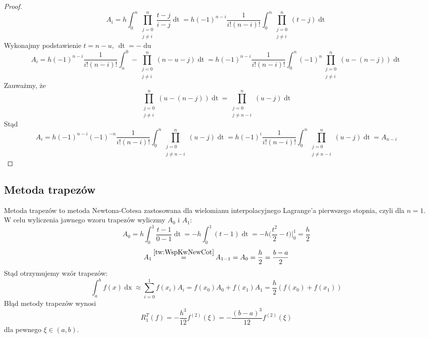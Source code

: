 \documentclass[11pt,wide]{article}
\newcommand\numeq[1]%
  {\stackrel{\scriptscriptstyle \mkern-1.5mu#1\mkern-1.5mu }{=}}
\begin{document}
\begin{proof}
\begin{equation}
A_i = h \int_0^n \prod_{\substack{j=0 \\ j \neq i}}^n \frac{t-j}{i-j} \mathop{dt} = h (-1)^{n-i} \frac{1}{i!(n-i)!} \int_0^n \prod_{\substack{j=0 \\ j \neq i}}^n (t-j) \mathop{dt}
\end{equation}
Wykonajmy podstawienie \(t = n - u, \ \mathop{dt} = - \mathop{du}\)
\begin{equation}
A_i = h (-1)^{n-i} \frac{1}{i!(n-i)!} \int_n^0 -\prod_{\substack{j=0 \\ j \neq i}}^n (n-u-j) \mathop{dt} = h (-1)^{n-i} \frac{1}{i!(n-i)!} \int_0^n (-1)^n \prod_{\substack{j=0 \\ j \neq i}}^n (u-(n-j)) \mathop{dt}
\end{equation}
Zauważmy, że
\begin{equation}
\prod_{\substack{j=0 \\ j \neq i}}^n (u-(n-j)) \mathop{dt} = \prod_{\substack{j=0 \\ j \neq n-i}}^n (u-j) \mathop{dt}
\end{equation}
Stąd
\begin{equation}
A_i = h (-1)^{n-i} (-1)^{-n}  \frac{1}{i!(n-i)!} \int_0^n \prod_{\substack{j=0 \\ j \neq n-i}}^n (u-j) \mathop{dt} = h (-1)^{i}  \frac{1}{i!(n-i)!} \int_0^n \prod_{\substack{j=0 \\ j \neq n-i}}^n (u-j) \mathop{dt} = A_{n-i}
\end{equation}
\end{proof}


\subsection{Metoda trapezów}
Metoda trapezów to metoda Newtona-Cotesa zastosowana dla wielomianu interpolacyjnego Lagrange'a pierwszego stopnia, czyli dla \(n = 1\).  W celu wyliczenia jawnego wzoru trapezów wyliczmy \(A_0\) i \(A_1\):
\begin{equation}
A_0 = h \int_0^1 \frac{t-1}{0-1} \mathop{dt} = -h \int_0^1 (t-1) \mathop{dt} = -h\Big(\frac{t^2}{2} - t\Big)\Big|_{0}^{1} = \frac{h}{2}
\end{equation}
\begin{equation}
A_1 \numeq{\eqref{tw:WspKwNewCot}} A_{1-1} = A_0 = \frac{h}{2} = \frac{b - a}{2}
\end{equation}
Stąd otrzymujemy wzór trapezów:
\begin{equation} \label{wzor:WzorTrapezow}
\int_a^b f(x)\mathop{dx} \approx \sum_{i=0}^1 f(x_i) A_i = f(x_0) A_0 + f(x_1) A_1 = \frac{h}{2} (f(x_0) + f(x_1))
\end{equation}
Błąd metody trapezów wynosi
\begin{equation} \label{wzor:BladTrapezow}
R_1^T(f) = - \frac{h^3}{12}f^{(2)}(\xi) = - \frac{(b-a)^3}{12}f^{(2)}(\xi)
\end{equation}
dla pewnego \(\xi \in (a, b)\).
\end{document}
